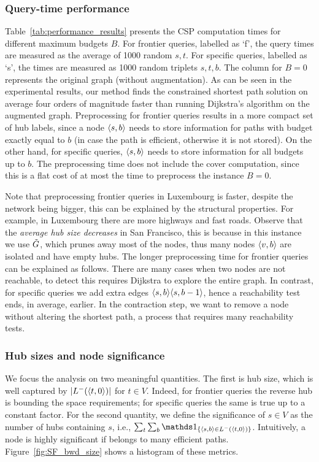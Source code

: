 \subsubsection{Query-time performance}


Table~\ref{tab:performance_results} presents the CSP computation times for different maximum budgets $B$. 
For frontier queries, labelled as `f', the query times are measured as the average of 1000 random $s,t$.
For specific queries, labelled as `s', the times are measured as 1000 random triplets $s,t,b$.
The column for $B=0$ represents the original graph (without augmentation). 
As can be seen in the experimental results, our method finds the constrained shortest path solution on average four orders of magnitude faster than running Dijkstra's algorithm on the augmented graph. 
Preprocessing for frontier queries results in a more compact set of hub labels, since a node $\langle s,b\rangle$ needs to store information for paths with budget exactly equal to $b$ (in case the path is efficient, otherwise it is not stored).
On the other hand, for specific queries, $\langle s,b\rangle$ needs to store information for all budgets up to $b$.
The preprocessing time does not include the cover computation, since this is a flat cost of at most the time to preprocess the instance $B=0$.

Note that preprocessing frontier queries in Luxembourg is faster, despite the network being bigger, this can be explained by the structural properties.
For example, in Luxembourg there are more highways and fast roads.
Observe that the \emph{average hub size decreases} in San Francisco, this is because in this instance we use $\tilde G$, which prunes away most of the nodes, thus many nodes $\langle v,b\rangle$ are isolated and have empty hubs.
The longer preprocessing time for frontier queries can be explained as follows.
There are many cases when two nodes are not reachable, to detect this requires Dijkstra to explore the entire graph.
In contrast, for specific queries we add extra edges $\langle s,b\rangle\langle s,b-1\rangle$, hence a reachability test ends, in average, earlier.
In the contraction step, we want to remove a node without altering the shortest path, a process that requires many reachability tests.


\subsubsection{Hub sizes and node significance}

We focus the analysis on two meaningful quantities.
The first is hub size, which is well captured by  $\lvert L^-(\langle t,0\rangle)\rvert$ for $t\in V$.
Indeed, for frontier queries the reverse hub is bounding the space requirements; for specific queries the same is true up to a constant factor.
For the second quantity, we define the significance of $s\in V$ as the number of hubs containing $s$, i.e., $\sum_t\sum_b\In{\pp{s,b}\in \Lb(\pp{t,0})}$.
Intuitively, a node is highly significant if belongs to many efficient paths.
Figure~\ref{fig:SF_bwd_size} shows a histogram of these metrics. 

